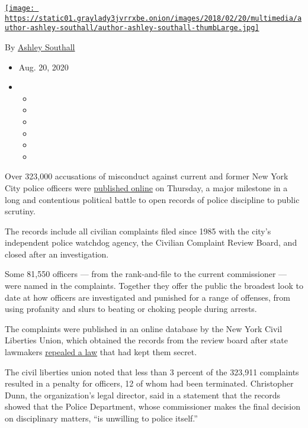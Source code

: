 \href{https://www.nytimes3xbfgragh.onion/by/ashley-southall}{\texttt{[image: https://static01.graylady3jvrrxbe.onion/images/2018/02/20/multimedia/author-ashley-southall/author-ashley-southall-thumbLarge.jpg]}}

By \href{https://www.nytimes3xbfgragh.onion/by/ashley-southall}{Ashley
Southall}

\begin{itemize}
\item
  Aug. 20, 2020
\item
  \begin{itemize}
  \item
  \item
  \item
  \item
  \item
  \item
  \end{itemize}
\end{itemize}

Over 323,000 accusations of misconduct against current and former New
York City police officers were
\href{https://www.nyclu.org/en/campaigns/nypd-misconduct-database}{published
online} on Thursday, a major milestone in a long and contentious
political battle to open records of police discipline to public
scrutiny.

The records include all civilian complaints filed since 1985 with the
city's independent police watchdog agency, the Civilian Complaint Review
Board, and closed after an investigation.

Some 81,550 officers --- from the rank-and-file to the current
commissioner --- were named in the complaints. Together they offer the
public the broadest look to date at how officers are investigated and
punished for a range of offenses, from using profanity and slurs to
beating or choking people during arrests.

The complaints were published in an online database by the New York
Civil Liberties Union, which obtained the records from the review board
after state lawmakers
\href{https://www.nytimes3xbfgragh.onion/2020/06/12/nyregion/50a-repeal-police-floyd.html}{repealed
a law} that had kept them secret.

The civil liberties union noted that less than 3 percent of the 323,911
complaints resulted in a penalty for officers, 12 of whom had been
terminated. Christopher Dunn, the organization's legal director, said in
a statement that the records showed that the Police Department, whose
commissioner makes the final decision on disciplinary matters, ``is
unwilling to police itself.''

